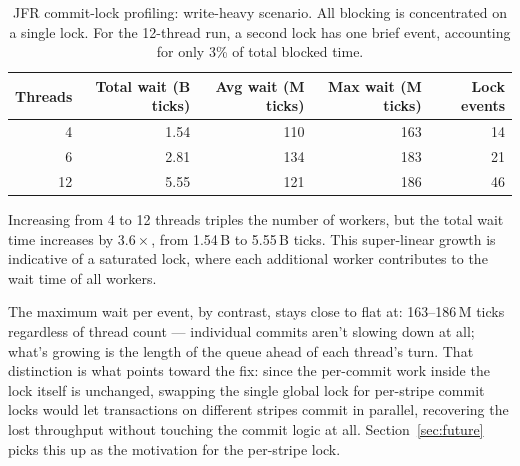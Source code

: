 \begin{table}[H]
  \centering
  \caption{JFR commit-lock profiling: write-heavy scenario. All blocking
    is concentrated on a single lock. For the 12-thread run, a second
    lock has one brief event, accounting for only 3\% of total blocked
    time.}
  \label{tab:jfr-summary}
  \begin{tabular}{@{}r r r r r@{}}
    \toprule
    \textbf{Threads}              &
    \textbf{Total wait (B ticks)} &
    \textbf{Avg wait (M ticks)}   &
    \textbf{Max wait (M ticks)}   &
    \textbf{Lock events}                                  \\
    \midrule
    4                             & 1.54 & 110 & 163 & 14 \\
    6                             & 2.81 & 134 & 183 & 21 \\
    12                            & 5.55 & 121 & 186 & 46 \\
    \bottomrule
  \end{tabular}
\end{table}

Increasing from 4 to 12 threads triples the number of workers, but the
total wait time increases by $3.6\times$, from 1.54\,B to 5.55\,B
ticks. This super-linear growth is indicative of a saturated lock,
where each additional worker contributes to the wait time of all
workers.

The maximum wait per event, by contrast, stays close to flat at: 163--186\,M
ticks regardless of thread count --- individual commits aren't slowing down at all;
what's growing is the length of the queue ahead of each thread's turn.
That distinction is what points toward the fix: since the
per-commit work inside the lock itself is unchanged, swapping the single
global lock for per-stripe commit locks would let transactions on different
stripes commit in parallel, recovering the lost throughput without touching
the commit logic at all. Section~\ref{sec:future} picks this up as the
motivation for the per-stripe lock.